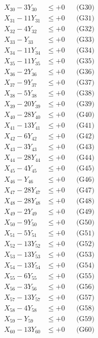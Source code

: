 \documentclass[a4paper,10pt]{article}
\begin{document}
{\begin{align}
X_{30} - 3Y_{30} &\leq +0 && \text{(G30)} \\
X_{31} - 11Y_{31} &\leq +0 && \text{(G31)} \\
\allowbreak
X_{32} - 4Y_{32} &\leq +0 && \text{(G32)} \\
X_{33} - Y_{33} &\leq +0 && \text{(G33)} \\
X_{34} - 11Y_{34} &\leq +0 && \text{(G34)} \\
X_{35} - 11Y_{35} &\leq +0 && \text{(G35)} \\
X_{36} - 2Y_{36} &\leq +0 && \text{(G36)} \\
X_{37} - 9Y_{37} &\leq +0 && \text{(G37)} \\
X_{38} - 5Y_{38} &\leq +0 && \text{(G38)} \\
X_{39} - 20Y_{39} &\leq +0 && \text{(G39)} \\
X_{40} - 28Y_{40} &\leq +0 && \text{(G40)} \\
X_{41} - 13Y_{41} &\leq +0 && \text{(G41)} \\
\allowbreak
X_{42} - 6Y_{42} &\leq +0 && \text{(G42)} \\
X_{43} - 3Y_{43} &\leq +0 && \text{(G43)} \\
X_{44} - 28Y_{44} &\leq +0 && \text{(G44)} \\
X_{45} - 4Y_{45} &\leq +0 && \text{(G45)} \\
X_{46} - Y_{46} &\leq +0 && \text{(G46)} \\
X_{47} - 28Y_{47} &\leq +0 && \text{(G47)} \\
X_{48} - 28Y_{48} &\leq +0 && \text{(G48)} \\
X_{49} - 2Y_{49} &\leq +0 && \text{(G49)} \\
X_{50} - 9Y_{50} &\leq +0 && \text{(G50)} \\
X_{51} - 5Y_{51} &\leq +0 && \text{(G51)} \\
\allowbreak
X_{52} - 13Y_{52} &\leq +0 && \text{(G52)} \\
X_{53} - 13Y_{53} &\leq +0 && \text{(G53)} \\
X_{54} - 13Y_{54} &\leq +0 && \text{(G54)} \\
X_{55} - 6Y_{55} &\leq +0 && \text{(G55)} \\
X_{56} - 3Y_{56} &\leq +0 && \text{(G56)} \\
X_{57} - 13Y_{57} &\leq +0 && \text{(G57)} \\
X_{58} - 4Y_{58} &\leq +0 && \text{(G58)} \\
X_{59} - Y_{59} &\leq +0 && \text{(G59)} \\
X_{60} - 13Y_{60} &\leq +0 && \text{(G60)} \\

\end{align}}
\end{document}
